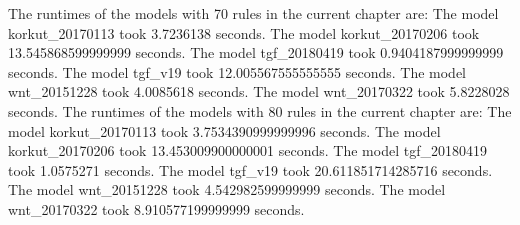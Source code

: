 {The runtimes of the models with 70 rules in the current chapter are: The model korkut_20170113 took 3.7236138 seconds. The model korkut_20170206 took 13.545868599999999 seconds. The model tgf_20180419 took 0.9404187999999999 seconds. The model tgf_v19 took 12.005567555555555 seconds. The model wnt_20151228 took 4.0085618 seconds. The model wnt_20170322 took 5.8228028 seconds. 
The runtimes of the models with 80 rules in the current chapter are: The model korkut_20170113 took 3.7534390999999996 seconds. The model korkut_20170206 took 13.453009900000001 seconds. The model tgf_20180419 took 1.0575271 seconds. The model tgf_v19 took 20.611851714285716 seconds. The model wnt_20151228 took 4.542982599999999 seconds. The model wnt_20170322 took 8.910577199999999 seconds. 
}